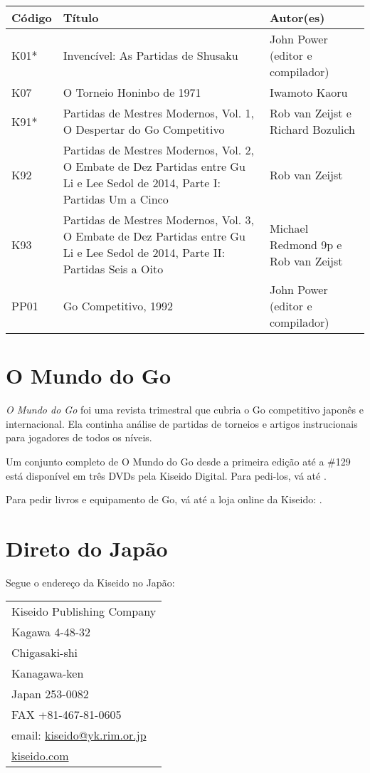 \begin{longtable}{l|p{55mm}|p{55mm}} 
    \hline
    \textbf{Código} & \textbf{Título} & \textbf{Autor(es)} \\
    \hline \hline
    K01* & Invencível: As Partidas de Shusaku & John Power (editor e compilador) \\
    \hline
    K07 & O Torneio Honinbo de 1971 & Iwamoto Kaoru \\
    \hline
    K91* & Partidas de Mestres Modernos, Vol. 1, O Despertar do Go Competitivo & Rob van Zeijst e Richard Bozulich \\
    \hline
    K92 & Partidas de Mestres Modernos, Vol. 2, O Embate de Dez Partidas entre Gu Li e Lee Sedol de 2014, Parte I: Partidas Um a Cinco & Rob van Zeijst \\
    \hline
    K93 & Partidas de Mestres Modernos, Vol. 3, O Embate de Dez Partidas entre Gu Li e Lee Sedol de 2014, Parte II: Partidas Seis a Oito & Michael Redmond 9p e Rob van Zeijst \\
    \hline
    PP01 & Go Competitivo, 1992 & John Power (editor e compilador) \\
    \hline
\end{longtable}

\section{O Mundo do Go}

\emph{O Mundo do Go} foi uma revista trimestral que cubria o Go competitivo japonês e internacional. Ela continha análise de partidas de torneios e artigos instrucionais para jogadores de todos os níveis.

Um conjunto completo de O Mundo do Go desde a primeira edição até a \#129 está disponível em três DVDs pela Kiseido Digital. Para pedi-los, vá até \href{https://www.kiseidodigital.com}{}.

Para pedir livros e equipamento de Go, vá até a loja online da Kiseido: \href{https://www.kiseido.com}{}.

\pagebreak

\section{Direto do Japão}

Segue o endereço da Kiseido no Japão:

\bigskip
\bigskip

\begin{tabular}{l}
    \hline
    Kiseido Publishing Company \\
    Kagawa 4-48-32 \\
    Chigasaki-shi \\
    Kanagawa-ken \\
    Japan 253-0082 \\
    FAX +81-467-81-0605 \\
    email: \href{mailto:kiseido@yk.rim.or.jp}{kiseido@yk.rim.or.jp} \\
    \href{https://www.kiseido.com}{kiseido.com} \\
    \hline
\end{tabular}